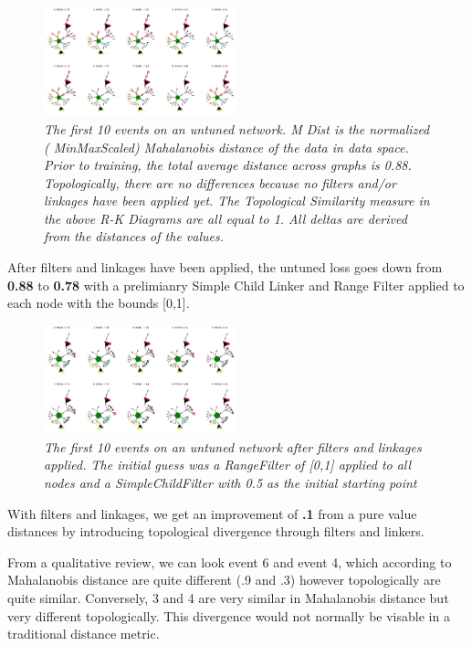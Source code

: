 \begin{figure}[H]
	\centering
        \includegraphics[width=0.5\textwidth]{images/store_sales_before_pipe_10.png}
	\caption{\textit{The first 10 events on an untuned network. M Dist is the normalized ( MinMaxScaled) Mahalanobis distance of the data in data space. Prior to training, the total average distance across graphs is 0.88. Topologically, there are no differences because no filters and/or linkages have been applied yet. The Topological Similarity measure in the above R-K Diagrams are all equal to 1. All deltas are derived from the distances of the values.}}
	\label{fig:fig5}
\end{figure}

After filters and linkages have been applied, the untuned loss goes down from \textbf{0.88} to \textbf{0.78} with a prelimianry Simple Child Linker and Range Filter applied to each node with the bounds [0,1].

\begin{figure}[H]
	\centering
        \includegraphics[width=0.5\textwidth]{images/store_sales_untuned_10.png}
	\caption{\textit{The first 10 events on an untuned network after filters and linkages applied. The initial guess was a RangeFilter of [0,1] applied to all nodes and a SimpleChildFilter with 0.5 as the initial starting point}}
	\label{fig:untuned_10}
\end{figure}


With filters and linkages, we get an improvement of \textbf{.1} from a pure value distances by introducing topological divergence through filters and linkers.

From a qualitative review, we can look event 6 and event 4, which according to Mahalanobis distance are quite different (.9 and .3) however topologically are quite similar. Conversely, 3 and 4 are very similar in Mahalanobis distance but very different topologically. This divergence would not normally be visable in a traditional distance metric.

